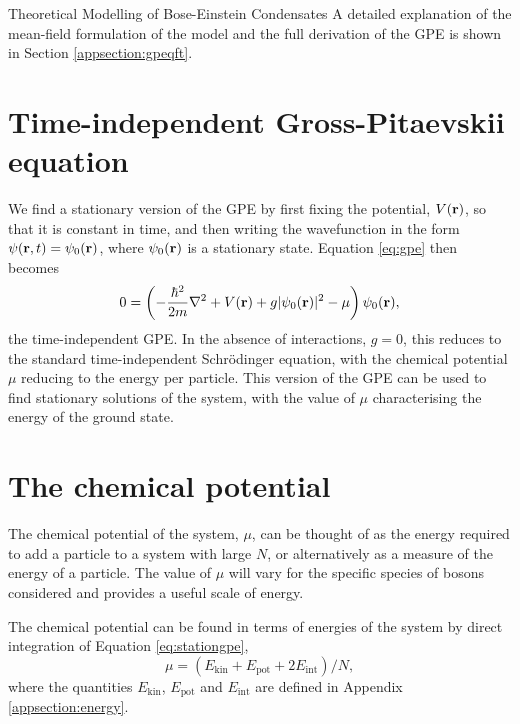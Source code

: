 \begin{chapter}{\label{cha:theoretical_model}Theoretical Modelling of Bose-Einstein Condensates}
A detailed explanation of the mean-field formulation of the model and the full derivation of the GPE is shown in Section \ref{appsection:gpeqft}.

\section{\label{section:gpestationary} Time-independent Gross-Pitaevskii equation}
 We find a stationary version of the GPE by first fixing the potential, $V({\bf r})$, so that it is constant in time, and then writing the wavefunction in the form $\psi({\bf r},t) = \psi_0({\bf r})$, where $\psi_0({\bf r})$ is a stationary state. Equation \ref{eq:gpe} then becomes
	\begin{equation}\label{eq:stationgpe}
		0 = \left( -\frac{\hbar^2}{2m}\nabla^2 + V({\bf r}) + g|\psi_0({\bf r})|^2 - \mu\right) \psi_0({\bf r}),
	\end{equation}
	the time-independent GPE. In the absence of interactions, $g=0$, this reduces to the standard time-independent Schr\"odinger equation, with the chemical potential $\mu$ reducing to the energy per particle. This version of the GPE can be used to find stationary solutions of the system, with the value of $\mu$ characterising the energy of the ground state.

\section{\label{section:mu} The chemical potential}
 The chemical potential of the system, $\mu$, can be thought of as the energy required to add a particle to a system with large $N$, or alternatively as a measure of the energy of a particle. The value of $\mu$ will vary for the specific species of bosons considered and provides a useful scale of energy.
 
 The chemical potential can be found in terms of energies of the system by direct integration of Equation \ref{eq:stationgpe},
 	\begin{equation}\label{eq:chempot}
 		\mu = \left ( E_{\mathrm{kin}} + E_{\mathrm{pot}} + 2E_{\mathrm{int}} \right ) / N,
 	\end{equation}
 	where the quantities $E_{\mathrm{kin}}$, $E_{\mathrm{pot}}$ and $E_{\mathrm{int}}$ are defined in Appendix \ref{appsection:energy}.


\end{chapter}
